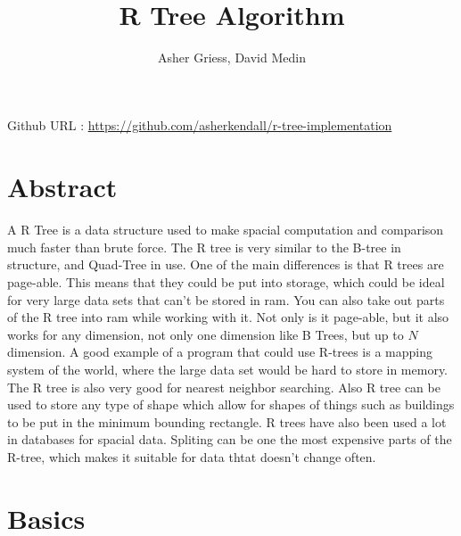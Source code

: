 \documentclass{article}
\author{Asher Griess, David Medin}
\title{R Tree Algorithm}
\begin{document}
\maketitle
\begin{center}
Github URL : \url{https://github.com/asherkendall/r-tree-implementation}
\end{center}

\begin{multicols}{2}[]
\section{Abstract}
\paragraph{}
A R Tree is a data structure used to make spacial computation and comparison much faster than brute force.
The R tree is very similar to the B-tree in structure, and Quad-Tree in use. One of the main differences is that
R trees are page-able. This means that they could be put into storage, which could be ideal for very large data sets 
that can't be stored in ram.  You can also take out parts of the R tree into ram while working with it. Not only is it page-able,
 but it also works for any dimension, not only one dimension like B Trees, but up to $N$ dimension. A good example
of a program that could use R-trees is a mapping system of the world, where the large data set would be hard to store in memory.
The R tree is also very good for nearest neighbor searching. Also R tree can be used to store any type of shape which allow for shapes
of things such as buildings to be put in the minimum bounding rectangle. R trees have also been used a lot in databases for spacial data.
Spliting can be one the most expensive parts of the R-tree, which makes it suitable for data thtat doesn't change often.

\section{Basics}


\end{multicols}
\end{document}
